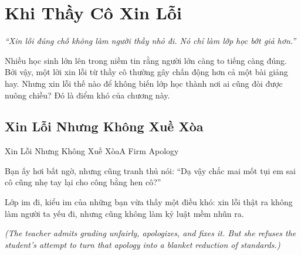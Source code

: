 \chapter{Khi Thầy Cô Xin Lỗi}

\begin{center}
	\textit{\color{bookprimary}``Xin lỗi đúng chỗ không làm người thầy nhỏ đi. Nó chỉ làm lớp học bớt giả hơn.''}
\end{center}

\ngancach

\begin{tcolorbox}[
	colback=bookprimary!6,
	colframe=bookprimary!35,
	arc=5pt,
	title={\bfseries Tại Sao Chương Này Quan Trọng?},
	fonttitle=\bfseries\color{bookprimary}
]
Nhiều học sinh lớn lên trong niềm tin rằng người lớn càng to tiếng càng đúng. Bởi vậy, một lời xin lỗi từ thầy cô thường gây chấn động hơn cả một bài giảng hay. Nhưng xin lỗi thế nào để không biến lớp học thành nơi ai cũng đòi được nuông chiều? Đó là điểm khó của chương này.
\end{tcolorbox}

\section{Xin Lỗi Nhưng Không Xuề Xòa}
\begin{truyen}{Xin Lỗi Nhưng Không Xuề Xòa}{A Firm Apology}

Bạn ấy hơi bất ngờ, nhưng cũng tranh thủ nói: ``Dạ vậy chắc mai mốt tụi em sai cô cũng nhẹ tay lại cho công bằng hen cô?''


Lớp im đi, kiểu im của những bạn vừa thấy một điều khó: xin lỗi thật ra không làm người ta yếu đi, nhưng cũng không làm kỷ luật mềm nhũn ra.

\textit{(The teacher admits grading unfairly, apologizes, and fixes it. But she refuses the student's attempt to turn that apology into a blanket reduction of standards.)}
\end{truyen}

